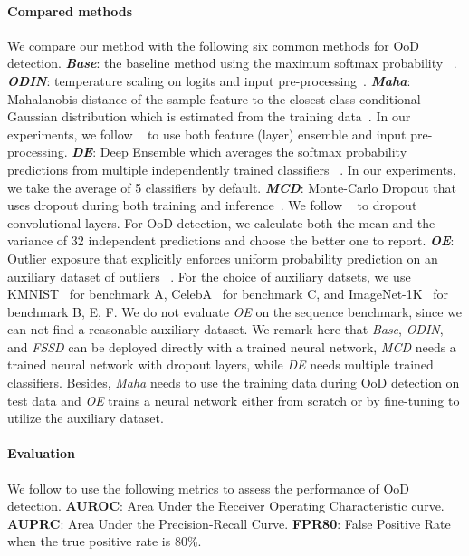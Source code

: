 \documentclass[letterpaper]{article}
\begin{document}
\paragraph{Compared methods}
We compare our method with the following six common methods for OoD detection. \textbf{\textit{Base}}: the baseline method using the maximum softmax probability ~\cite{hendrycks17baseline}.
\textbf{\textit{ODIN}}:  temperature scaling on  logits  and input pre-processing~\cite{odin}.
\textbf{\textit{Maha}}: Mahalanobis distance of the sample feature to the closest class-conditional Gaussian distribution which is estimated from the training data~\cite{mahalanobis}.
In our experiments, we follow ~\cite{mahalanobis} to use both feature (layer) ensemble and input pre-processing. 
\textbf{\textit{DE}}: Deep Ensemble which averages the softmax probability predictions from multiple independently trained classifiers ~\cite{deepensemble}.
In our experiments, we take the average of 5 classifiers by default.
\textbf{\textit{MCD}}: Monte-Carlo Dropout that uses dropout during both training and inference~\cite{mcdropout}.
We follow ~\cite{Ovadia2019CanYT} to dropout convolutional layers.
For OoD detection, we calculate both the mean and the variance of 32 independent predictions and choose the better one to report.
\textbf{\textit{OE}}: Outlier exposure that explicitly enforces uniform probability prediction on an auxiliary dataset of outliers ~\cite{outlierexposure}.
For the choice of auxiliary datsets, we use KMNIST~\cite{kmnist} for benchmark A, CelebA~\cite{celeba} for benchmark C, and ImageNet-1K~\cite{imagenet} for benchmark B, E, F.
We do not evaluate \textit{OE} on the sequence benchmark, since we can not find a reasonable auxiliary dataset.
We remark here that \textit{Base}, \textit{ODIN}, and \textit{FSSD} can be deployed directly with a trained neural network, \textit{MCD} needs a trained neural network with dropout layers, while \textit{DE} needs multiple trained classifiers.
Besides, \textit{Maha} needs to use the training data during OoD detection on test data and \textit{OE} trains a neural network either from scratch or by fine-tuning to utilize the auxiliary dataset. 


\paragraph{Evaluation}
We follow \cite{ren2019likelihood, outlierexposure} to use the following metrics to assess the performance of OoD detection.
\textbf{AUROC}: Area Under the Receiver Operating Characteristic curve.
\textbf{AUPRC}: Area Under the Precision-Recall Curve.
\textbf{FPR80}: False Positive Rate when the true positive rate is 80\%.
\end{document}
